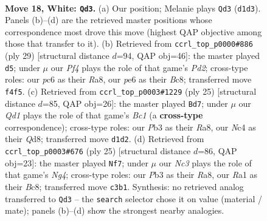 \documentclass[11pt]{article}
\begin{document}
\clearpage

\begin{figure}[p]\centering
\begin{subfigure}{0.46\textwidth}\centering
\resizebox{\linewidth}{!}{%
\newchessgame
\chessboard[
  setfen={2r1b1k1/p1qr1pp1/npp1pn2/7p/PbNP1P2/1PN3P1/4P2P/R1BQRBK1 w - - 6 18},
  showmover=false,
  pgfstyle=straightmove, color=movearrow, markmove={d1-d3}
]}
\caption{}
\end{subfigure}\hfill
\begin{subfigure}{0.46\textwidth}\centering
\resizebox{\linewidth}{!}{%
\newchessgame
\chessboard[
  setfen={r1brn1k1/1q1p1ppp/p1n1p3/1p4P1/1b2P2P/1NN1BP2/PPPQ4/2KR1B1R b - - 0 15},
  showmover=false,
  pgfstyle=straightmove, color=movearrow, markmove={d7-d5}
]}
\caption{}
\end{subfigure}
\\[4pt]
\begin{subfigure}{0.46\textwidth}\centering
\resizebox{\linewidth}{!}{%
\newchessgame
\chessboard[
  setfen={r1bqr1k1/1p2bppp/p2p1n2/4pPB1/Pn2P3/1NN5/1PP1B1PP/R2Q1R1K b - - 2 13},
  showmover=false,
  pgfstyle=straightmove, color=movearrow, markmove={c8-d7}
]}
\caption{}
\end{subfigure}\hfill
\begin{subfigure}{0.46\textwidth}\centering
\resizebox{\linewidth}{!}{%
\newchessgame
\chessboard[
  setfen={r1b2rk1/1pq1p1bp/n1pp2p1/p4pn1/N1PP3P/1P4P1/PB1NPPB1/2RQ1RK1 b - - 0 13},
  showmover=false,
  pgfstyle=straightmove, color=movearrow, markmove={g5-f7}
]}
\caption{}
\end{subfigure}
\caption{\textbf{Move 18, White: \texttt{Qd3}.} (a) Our position; Melanie plays \texttt{Qd3} (\texttt{d1d3}). Panels (b)--(d) are the retrieved master positions whose correspondence most drove this move (highest QAP objective among those that transfer to it). (b) Retrieved from \texttt{ccrl\_top\_p0000\#886} (ply 29) [structural distance $d$=94, QAP obj=46]: the master played \texttt{d5}; under $\mu$ our \emph{Pf4} plays the role of that game's \emph{Pd2}; cross-type roles: our \emph{p}c6 as their \emph{R}a8, our \emph{p}e6 as their \emph{B}c8; transferred move \texttt{f4f5}. (c) Retrieved from \texttt{ccrl\_top\_p0003\#1229} (ply 25) [structural distance $d$=85, QAP obj=26]: the master played \texttt{Bd7}; under $\mu$ our \emph{Qd1} plays the role of that game's \emph{Bc1} (a \textbf{cross-type} correspondence); cross-type roles: our \emph{P}b3 as their \emph{R}a8, our \emph{N}c4 as their \emph{Q}d8; transferred move \texttt{d1d2}. (d) Retrieved from \texttt{ccrl\_top\_p0003\#676} (ply 25) [structural distance $d$=86, QAP obj=23]: the master played \texttt{Nf7}; under $\mu$ our \emph{Nc3} plays the role of that game's \emph{Ng4}; cross-type roles: our \emph{P}b3 as their \emph{R}a8, our \emph{R}a1 as their \emph{B}c8; transferred move \texttt{c3b1}. Synthesis: no retrieved analog transferred to \texttt{Qd3} -- the \texttt{search} selector chose it on value (material / mate); panels (b)--(d) show the strongest nearby analogies.}
\label{fig:thought-m34}
\end{figure}
\end{document}
